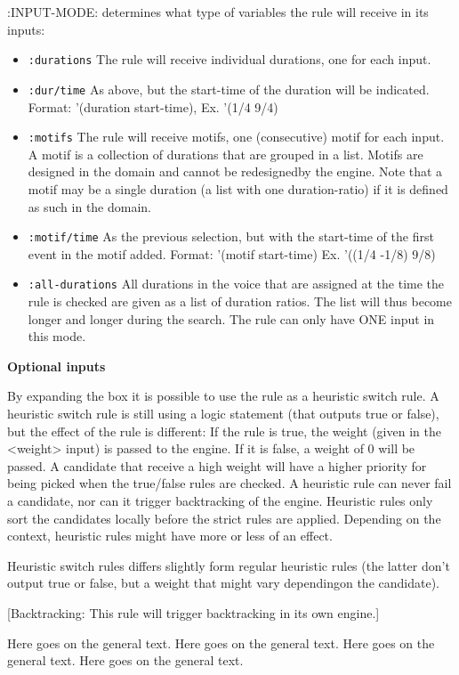 :INPUT-MODE: determines what type of variables the rule will receive in its inputs:
\begin{itemize}
\item \texttt{:durations} The rule will receive individual durations, one for each input.
\item \texttt{:dur/time} As above, but the start-time of the duration will be indicated.
Format: '(duration start-time), Ex. '(1/4 9/4)
\item \texttt{:motifs} The rule will receive motifs, one (consecutive) motif for each 
input. A motif is a collection of durations that are grouped in 
a list. Motifs are designed in the domain and cannot be 
redesignedby the engine. Note that a motif may be a single 
duration (a list with one duration-ratio) if it is defined as 
such in the domain.
\item \texttt{:motif/time} As the previous selection, but with the start-time of the first event in the motif added. Format: '(motif start-time)
Ex. '((1/4 -1/8) 9/8)
\item \texttt{:all-durations} All durations in the voice that are assigned at the time the rule is checked are given as a list of duration ratios. The list will thus become longer and longer during the search. The rule can only have ONE input in this mode.
\end{itemize}

\textbf{Optional inputs}

By expanding the box it is possible to use the rule as a heuristic switch rule. A heuristic switch rule is still using a logic statement (that outputs true or false), but the effect of the rule is different: If the rule is true, the weight (given in the <weight> input) is passed to the engine. If it is false, a weight of 0 will be passed. A candidate that receive a high weight will have a higher priority for being picked when the true/false rules are checked. A heuristic rule can never fail a candidate, nor can it trigger backtracking of the engine. Heuristic rules only sort the candidates locally before the strict rules are applied. Depending on the context, heuristic rules might have more or less of an effect. 

Heuristic switch rules differs slightly form regular heuristic rules (the latter don't output true or false, but a weight that might vary dependingon the candidate).

[Backtracking: This rule will trigger backtracking in its own engine.]


Here goes on the general text. Here goes on the general text. Here
goes on the general text. Here goes on the general text.
